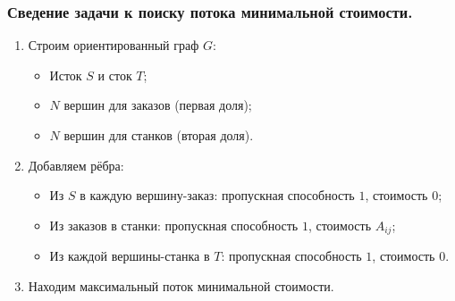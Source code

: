 \documentclass[a4paper,14pt]{article}
\begin{document}
    \subsubsection*{Сведение задачи к поиску потока минимальной стоимости.}
    \begin{enumerate}
    \item Строим ориентированный граф $G$:
    \begin{itemize}
        \item Исток $S$ и сток $T$;
        \item $N$ вершин для заказов (первая доля);
        \item $N$ вершин для станков (вторая доля).
    \end{itemize}
    
    \item Добавляем рёбра:
    \begin{itemize}
        \item Из $S$ в каждую вершину-заказ: пропускная способность $1$, стоимость $0$;
        \item Из заказов в станки: пропускная способность $1$, стоимость $A_{ij}$;
        \item Из каждой вершины-станка в $T$: пропускная способность $1$, стоимость $0$.
    \end{itemize}
    
    \item Находим максимальный поток минимальной стоимости.
    \end{enumerate}
\end{document}
